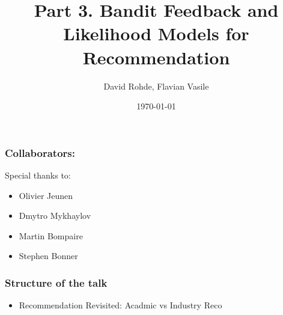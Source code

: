 \documentclass[10pt]{beamer}
\title{Part 3. Bandit Feedback and Likelihood Models for Recommendation}
\date{\today}
\author{David Rohde, Flavian Vasile}
\institute{Criteo Research}
\begin{document}
\maketitle

\begin{frame}
\frametitle{Collaborators:}

Special thanks to:
\begin{itemize}
    \item Olivier Jeunen
    \item Dmytro Mykhaylov
    \item Martin Bompaire
    \item Stephen Bonner
\end{itemize}

\end{frame}


\begin{frame}
\frametitle{Structure of the talk}

\begin{itemize}
\item Recommendation Revisited: Acadmic vs Industry Reco
\end{itemize}

\end{frame}



%
%
%
%
%
%
%
%
%


\end{document}
